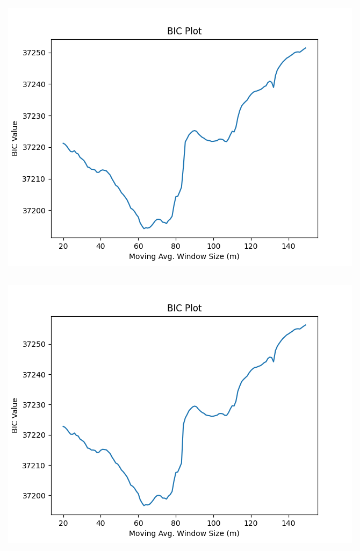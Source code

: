 \documentclass[12pt]{article}
\begin{document}
\begin{figure}[!ht]
  \begin{subfigure}[!ht]{0.45\textwidth}
    \includegraphics[width=\linewidth]{Prop_Vol}
  \end{subfigure}\hfill
  \begin{subfigure}[!ht]{0.45\textwidth}
    \includegraphics[width=\linewidth]{Vol}
  \end{subfigure}

\end{figure}

\pagebreak
\end{document}
